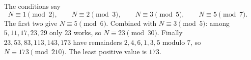 The conditions say
\[
N\equiv1\pmod 2,\qquad N\equiv2\pmod 3,\qquad N\equiv3\pmod 5,\qquad N\equiv5\pmod 7 .
\]
The first two give $N\equiv5\pmod 6$. Combined with $N\equiv3\pmod5$: among $5,11,17,23,29$ only $23$ works, so $N\equiv23\pmod{30}$. Finally $23,53,83,113,143,173$ have remainders $2,4,6,1,3,5$ modulo $7$, so $N\equiv173\pmod{210}$. The least positive value is $\boxed{173}$.
